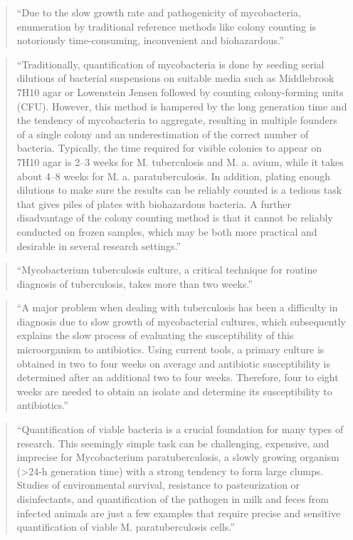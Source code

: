 \documentclass[]{tufte-book}
\begin{document}
\begin{quote}
``Due to the slow growth rate and pathogenicity of mycobacteria, enumeration by
traditional reference methods like colony counting is notoriously
time-consuming, inconvenient and biohazardous.'' \citep{pathak2012counting}
\end{quote}

\begin{quote}
``Traditionally, quantification of mycobacteria is done by seeding serial
dilutions of bacterial suspensions on suitable media such as Middlebrook 7H10
agar or Lowenstein Jensen followed by counting colony-forming units (CFU).
However, this method is hampered by the long generation time and the tendency of
mycobacteria to aggregate, resulting in multiple founders of a single colony and
an underestimation of the correct number of bacteria. Typically, the time
required for visible colonies to appear on 7H10 agar is 2--3 weeks for M.
tuberculosis and M. a. avium, while it takes about 4--8 weeks for M. a.
paratuberculosis. In addition, plating enough dilutions to make sure the results
can be reliably counted is a tedious task that gives piles of plates with
biohazardous bacteria. A further disadvantage of the colony counting method is
that it cannot be reliably conducted on frozen samples, which may be both more
practical and desirable in several research settings.'' \citep{pathak2012counting}
\end{quote}

\begin{quote}
``Mycobacterium tuberculosis culture, a critical technique for routine diagnosis of tuberculosis, takes more than two weeks.'' \citep{ghodbane2014dramatic}
\end{quote}

\begin{quote}
``A major problem when dealing with tuberculosis has been a difficulty in
diagnosis due to slow growth of mycobacterial cultures, which subsequently
explains the slow process of evaluating the susceptibility of this microorganism
to antibiotics. Using current tools, a primary culture is obtained in two to
four weeks on average and antibiotic susceptibility is determined after an
additional two to four weeks. Therefore, four to eight weeks are needed to
obtain an isolate and determine its susceptibility to antibiotics.''
\citep{ghodbane2014dramatic}
\end{quote}

\begin{quote}
``Quantification of viable bacteria is a crucial foundation for many types of
research. This seemingly simple task can be challenging, expensive, and
imprecise for Mycobacterium paratuberculosis, a slowly growing organism (\textgreater24-h
generation time) with a strong tendency to form large clumps. Studies of
environmental survival, resistance to pasteurization or disinfectants, and
quantification of the pathogen in milk and feces from infected animals are just
a few examples that require precise and sensitive quantification of viable M.
paratuberculosis cells.'' \citep{shin2007rapid}
\end{quote}
\end{document}

